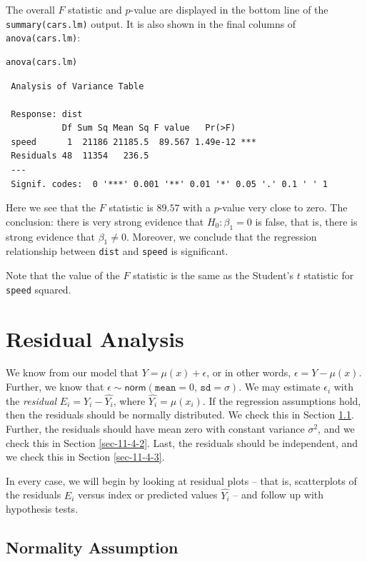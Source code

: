 \documentclass[captions=tableheading]{scrbook}
\begin{document}
The overall \(F\) statistic and \(p\)-value are displayed in the bottom line of the \texttt{summary(cars.lm)} output. It is also shown in the final columns of \texttt{anova(cars.lm)}:


\begin{verbatim}
anova(cars.lm)
\end{verbatim}

\begin{verbatim}
 Analysis of Variance Table
 
 Response: dist
           Df Sum Sq Mean Sq F value   Pr(>F)    
 speed      1  21186 21185.5  89.567 1.49e-12 ***
 Residuals 48  11354   236.5                     
 ---
 Signif. codes:  0 '***' 0.001 '**' 0.01 '*' 0.05 '.' 0.1 ' ' 1
\end{verbatim}



Here we see that the \(F\) statistic is \(  89.57 \) with a \(p\)-value very close to zero. The conclusion: there is very strong evidence that \(H_{0}:\beta_{1} = 0 \) is false, that is, there is strong evidence that \( \beta_{1} \neq 0 \). Moreover, we conclude that the regression relationship between \texttt{dist} and \texttt{speed} is significant.

Note that the value of the \(F\) statistic is the same as the Student's \(t\) statistic for \texttt{speed} squared.
\section{Residual Analysis}
\label{sec-11-4}
\label{sec-Residual-Analysis-SLR}


We know from our model that \(Y=\mu(x)+\epsilon\), or in other words, \(\epsilon=Y-\mu(x)\). Further, we know that \(\epsilon\sim\mathsf{norm}(\mathtt{mean}=0,\,\mathtt{sd}=\sigma)\). We may estimate \(\epsilon_{i}\) with the \emph{residual} \(E_{i}=Y_{i}-\hat{Y_{i}}\), where \(\hat{Y_{i}}=\hat{\mu}(x_{i})\). If the regression assumptions hold, then the residuals should be normally distributed. We check this in Section \ref{sec-11-4-1}. Further, the residuals should have mean zero with constant variance \(\sigma^{2}\), and we check this in Section \ref{sec-11-4-2}. Last, the residuals should be independent, and we check this in Section \ref{sec-11-4-3}.

In every case, we will begin by looking at residual plots -- that is, scatterplots of the residuals \(E_{i}\) versus index or predicted values \(\hat{Y_{i}}\) -- and follow up with hypothesis tests.
\subsection{Normality Assumption}
\label{sec-11-4-1}
\label{sub-Normality-Assumption}
\end{document}
